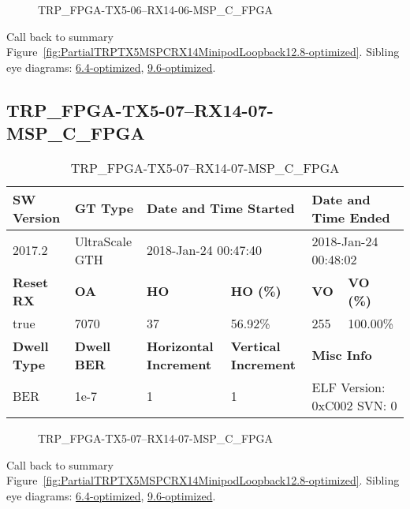 \begin{figure}[h]
\caption{TRP\_FPGA-TX5-06--RX14-06-MSP\_C\_FPGA} \label{fig:TRPFPGATX506RX1406MSPCFPGA12.8-optimized}
\end{figure}

Call back to summary Figure~\ref{fig:PartialTRPTX5MSPCRX14MinipodLoopback12.8-optimized}.
Sibling eye diagrams: \hyperref[sec:TRPFPGATX506RX1406MSPCFPGA6.4-optimized]{6.4-optimized}, \hyperref[sec:TRPFPGATX506RX1406MSPCFPGA9.6-optimized]{9.6-optimized}.

\clearpage
\newpage


\subsection{TRP\_FPGA-TX5-07--RX14-07-MSP\_C\_FPGA}\label{sec:TRPFPGATX507RX1407MSPCFPGA12.8-optimized}

\begin{table}[h]
\centering
\caption{TRP\_FPGA-TX5-07--RX14-07-MSP\_C\_FPGA}
\label{tab:TRPFPGATX507RX1407MSPCFPGA12.8-optimized}
\begin{tabular}{@{}|l|l|l|l|l|l|@{}}
\toprule
\textbf{SW Version}                & \textbf{GT Type}   & \multicolumn{2}{l|}{\textbf{Date and Time Started}}            & \multicolumn{2}{l|}{\textbf{Date and Time Ended}}        \\ \midrule
2017.2                       & UltraScale GTH          & \multicolumn{2}{l|}{2018-Jan-24 00:47:40}                   & \multicolumn{2}{l|}{2018-Jan-24 00:48:02}               \\ \midrule
\textbf{Reset RX}                  & \textbf{OA} & \textbf{HO}   & \textbf{HO (\%)} & \textbf{VO} & \textbf{VO (\%)} \\ \midrule
true & 7070        & 37          & 56.92\%        & 255        & 100.00\%       \\ \midrule
\textbf{Dwell Type}                & \textbf{Dwell BER} & \textbf{Horizontal Increment} & \textbf{Vertical Increment}    & \multicolumn{2}{l|}{\textbf{Misc Info}}                  \\ \midrule
BER                            & 1e-7        & 1        & 1           & \multicolumn{2}{l|}{ELF Version: 0xC002 SVN: 0}                         \\ \bottomrule
\end{tabular}
\end{table}

\begin{figure}[h]
\caption{TRP\_FPGA-TX5-07--RX14-07-MSP\_C\_FPGA} \label{fig:TRPFPGATX507RX1407MSPCFPGA12.8-optimized}
\end{figure}

Call back to summary Figure~\ref{fig:PartialTRPTX5MSPCRX14MinipodLoopback12.8-optimized}.
Sibling eye diagrams: \hyperref[sec:TRPFPGATX507RX1407MSPCFPGA6.4-optimized]{6.4-optimized}, \hyperref[sec:TRPFPGATX507RX1407MSPCFPGA9.6-optimized]{9.6-optimized}.

\clearpage
\newpage

